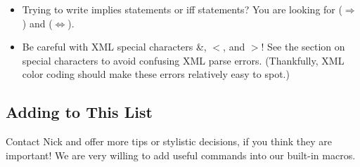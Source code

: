{\begin{itemize}
      The matching command  can be used with the pipe character $|$ to produce effective set builder notation (and that's exactly how  does it!)
      \item Trying to write implies statements or iff statements? You are looking for  ($\Rightarrow$) and  ($\Leftrightarrow$).
      \item Be careful with XML special characters \&, $<$, and $>$! See the section on special characters to avoid confusing XML parse errors. (Thankfully, XML color coding should make these errors relatively easy to spot.)
    \end{itemize}
    
  \subsection{Adding to This List}
    Contact Nick and offer more tips or stylistic decisions, if you think 
    they are important! We are very willing to add useful commands into our 
    built-in macros.
  
  
}
  
  
  